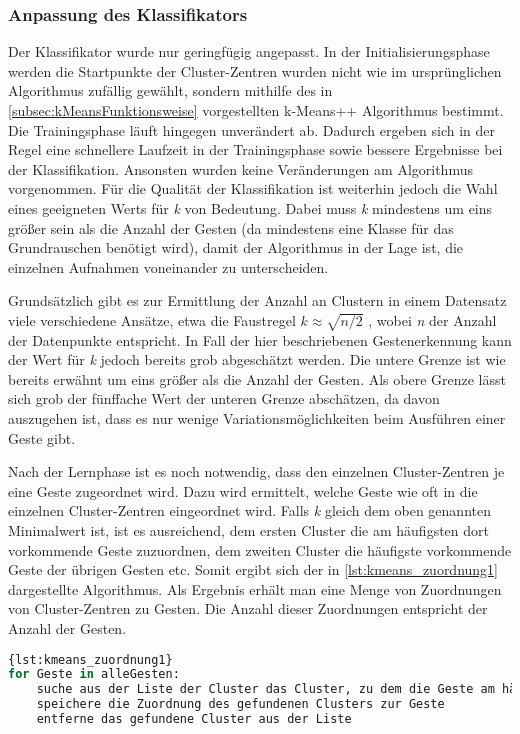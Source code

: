 \subsubsection{Anpassung des Klassifikators}
Der Klassifikator wurde nur geringfügig angepasst.
In der Initialisierungsphase werden die Startpunkte der Cluster-Zentren wurden nicht wie im ursprünglichen Algorithmus zufällig gewählt, sondern mithilfe des in \autoref{subsec:kMeansFunktionsweise} vorgestellten k-Means++ Algorithmus bestimmt. Die Trainingsphase läuft hingegen unverändert ab.
Dadurch ergeben sich in der Regel eine schnellere Laufzeit in der Trainingsphase sowie bessere Ergebnisse bei der Klassifikation.
Ansonsten wurden keine Veränderungen am Algorithmus vorgenommen.
Für die Qualität der Klassifikation ist weiterhin jedoch die Wahl eines geeigneten Werts für \emph{k} von Bedeutung. Dabei muss \emph{k} mindestens um eins größer sein als die Anzahl der Gesten (da mindestens eine Klasse für das Grundrauschen benötigt wird),
damit der Algorithmus in der Lage ist, die einzelnen Aufnahmen voneinander zu unterscheiden.  

Grundsätzlich gibt es zur Ermittlung der Anzahl an Clustern in einem Datensatz viele verschiedene Ansätze, etwa die Faustregel $k \approx \sqrt{n/2}$ \cite{WikipediaKMeansKValue}, wobei \emph{n} der Anzahl der Datenpunkte entspricht. In Fall der hier beschriebenen Gestenerkennung kann der Wert für \emph{k} jedoch bereits grob abgeschätzt werden. 
Die untere Grenze ist wie bereits erwähnt um eins größer als die Anzahl der Gesten.
Als obere Grenze lässt sich grob der fünffache Wert der unteren Grenze abschätzen, da davon auszugehen ist, dass es nur wenige Variationsmöglichkeiten beim Ausführen einer Geste gibt.

Nach der Lernphase ist es noch notwendig, dass den einzelnen Cluster-Zentren je eine Geste zugeordnet wird. Dazu wird ermittelt, welche Geste wie oft in die einzelnen Cluster-Zentren eingeordnet wird. Falls \emph{k} gleich dem oben genannten Minimalwert ist, ist es ausreichend, dem ersten Cluster die am häufigsten dort vorkommende Geste zuzuordnen, dem zweiten Cluster die häufigste vorkommende Geste der übrigen Gesten etc. 
Somit ergibt sich der in 
\autoref{lst:kmeans_zuordnung1}
dargestellte Algorithmus.
Als Ergebnis erhält man eine Menge von Zuordnungen von Cluster-Zentren zu Gesten. Die Anzahl dieser Zuordnungen entspricht der Anzahl der Gesten.

\begin{lstlisting}[language=Python,caption={Zuordnung von Cluster-Zentrum zu Geste, Variante 1},label={lst:kmeans_zuordnung1}]{lst:kmeans_zuordnung1}
for Geste in alleGesten:
    suche aus der Liste der Cluster das Cluster, zu dem die Geste am häufigsten zugeordnet wird
    speichere die Zuordnung des gefundenen Clusters zur Geste
    entferne das gefundene Cluster aus der Liste
\end{lstlisting}

